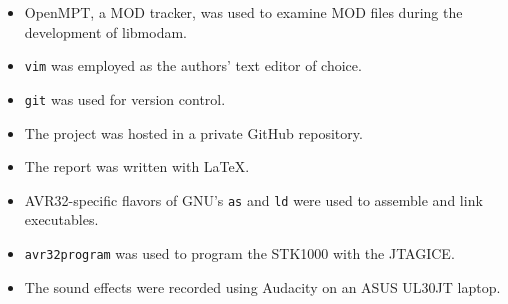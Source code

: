 \begin{itemize}
\item OpenMPT, a MOD tracker, was used to examine MOD files during the development of libmodam.
\item \texttt{vim} was employed as the authors' text editor of choice.
\item \texttt{git} was used for version control.
\item The project was hosted in a private GitHub repository.
\item The report was written with \LaTeX.
\item AVR32-specific flavors of GNU's \texttt{as} and \texttt{ld} were used to assemble and link executables.
\item \texttt{avr32program} was used to program the STK1000 with the JTAGICE.
\item The sound effects were recorded using Audacity on an ASUS UL30JT laptop.
\end{itemize}

